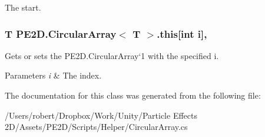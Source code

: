 The start.\hypertarget{class_p_e2_d_1_1_circular_array_abdeb1c16da88d4b2d96b72ec725e7c2e}{}
\subsubsection[{this[int i]}]{\setlength{\rightskip}{0pt plus 5cm}T {\bf P\+E2\+D.\+Circular\+Array}$<$ T $>$.this\mbox{[}int i\mbox{]}\hspace{0.3cm}{\ttfamily [get]}, {\ttfamily [set]}}\label{class_p_e2_d_1_1_circular_array_abdeb1c16da88d4b2d96b72ec725e7c2e}


Gets or sets the P\+E2\+D.\+Circular\+Array`1 with the specified i. 


\begin{DoxyParams}{Parameters}
{\em i} & The index.\\
\hline
\end{DoxyParams}


The documentation for this class was generated from the following file\+:\begin{DoxyCompactItemize}
\item 
/\+Users/robert/\+Dropbox/\+Work/\+Unity/\+Particle Effects 2\+D/\+Assets/\+P\+E2\+D/\+Scripts/\+Helper/Circular\+Array.\+cs\end{DoxyCompactItemize}
